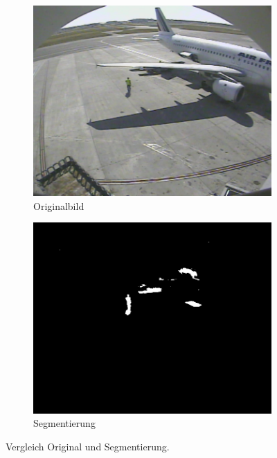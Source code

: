 \documentclass[]{scrartcl}
\begin{document}
\begin{figure}[h!]
\centering
\begin{subfigure}{.5\textwidth}
  \centering
  \includegraphics[width=.8\linewidth]{S3A3202_0100.jpeg}
  \caption{Originalbild}
  \label{fig:orig}
\end{subfigure}%
\begin{subfigure}{.5\textwidth}
  \centering
  \includegraphics[width=.8\linewidth]{Seg_S3A3202_0100.jpeg}
  \caption{Segmentierung}
  \label{fig:seg}
\end{subfigure}
\caption{Vergleich Original und Segmentierung.}
\label{fig:vergleich}
\end{figure}




\end{document}
